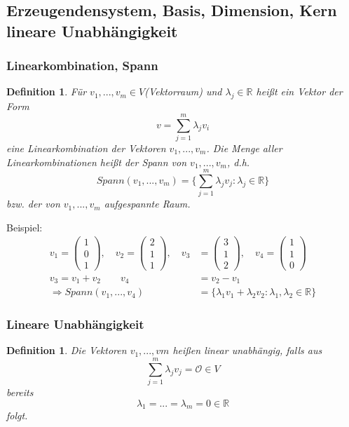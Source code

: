 \documentclass[12pt,a4paper]{report}%
\newtheorem{definition}[satz]{Definition}
\numberwithin{equation}{section}
\newcommand{\R}{\mathbb{R}} %
\def\vecT#1{\left(\begin{array}{c} #1 \end{array}\right)}
\def\vecN{\mathcal{O}}
\def\inRs{\in \R}
\def\brac#1{\left( #1 \right)}
\numberwithin{equation}{subsection}
\begin{document}
	  \subsection{Erzeugendensystem, Basis, Dimension, Kern lineare Unabhängigkeit}
	  \subsubsection{Linearkombination, Spann}
	  \begin{definition}
	    Für $v_1,...,v_m \in V$(Vektorraum) und $\lambda_j \inRs $ heißt ein Vektor der Form 
	    \begin{equation}
	      v = \sum_{j = 1}^m \lambda_j v_i
	    \end{equation}
	    eine Linearkombination der Vektoren $v_1,...,v_m$. Die Menge aller Linearkombinationen heißt der Spann von $v_1,...,v_m$, d.h.
	    \begin{equation}
	      Spann(v_1,...,v_m) = \lbrace \sum_{j=1}^m \lambda_j v_j: \lambda_j \inRs \rbrace
      \end{equation}	     
      bzw. der von $v_1,...,v_m$ aufgespannte Raum. \cite{HM12}
	  \end{definition}
	  
	  Beispiel:
	  \begin{align*}
	    v_1 = \vecT{1\\0\\1}, \quad v_2 = \vecT{2\\1\\1}, \quad v_3 &= \vecT{3\\1\\2}, \quad v_4 = \vecT{1\\1\\0}\\
	    v_3 = v_1 + v_2 \quad \quad v_4 &= v_2-v_1\\
	    \Rightarrow Spann\brac{v_1,...,v_4} &= \lbrace \lambda_1 v_1 + \lambda_2 v_2: \lambda_1, \lambda_2 \inRs \rbrace
	  \end{align*}
	  
	  \subsubsection{Lineare Unabhängigkeit}
	  \begin{definition}
	    Die Vektoren $v_1,...,vm$ heißen linear unabhängig, falls aus 
	    \begin{equation}
	      \sum_{j=1}^m \lambda_j v_j = \vecN \in V
	    \end{equation}
	    bereits 
	    \begin{equation}
	      \lambda_1 = ... = \lambda_m = 0 \inRs 
	    \end{equation}
	    folgt.
	  \end{definition}
	  
\end{document}
